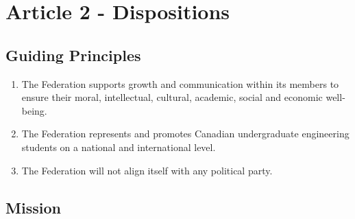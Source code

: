 \section{Article 2 - Dispositions}
\label{article-2-dispositions}

\subsection{Guiding Principles}
\label{guiding-principles}

\begin{enumerate}
 \item The Federation supports growth and communication within its members to ensure their moral, intellectual, cultural, academic, social and economic well-being.
 \item The Federation represents and promotes Canadian undergraduate engineering students on a national and international level.
 \item The Federation will not align itself with any political party.
\end{enumerate}

\subsection{Mission}
\label{mission}

